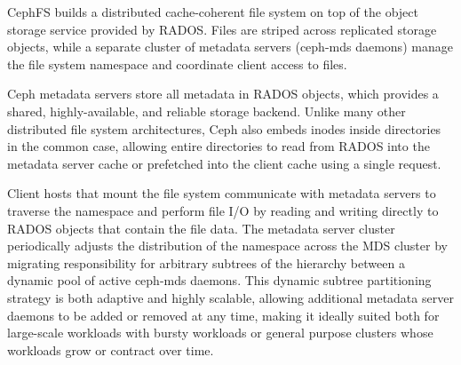 CephFS builds a distributed cache-coherent file system on top of the object
storage service provided by RADOS.  Files are striped across replicated
storage objects, while a separate cluster of metadata servers (ceph-mds
daemons) manage the file system namespace and coordinate client access to
files.  

Ceph metadata servers store all metadata in RADOS objects, which provides a
shared, highly-available, and reliable storage backend.  Unlike many other
distributed file system architectures, Ceph also embeds inodes inside
directories in the common case, allowing entire directories to read from RADOS
into the metadata server cache or prefetched into the client cache using a
single request.

Client hosts that mount the file system communicate with metadata
servers to traverse the namespace and perform file I/O by reading and writing
directly to RADOS objects that contain the file data.  The metadata server
cluster periodically adjusts
the distribution of the namespace across the MDS cluster by migrating
responsibility for arbitrary subtrees of the hierarchy between a dynamic pool
of active ceph-mds daemons.  This dynamic subtree
partitioning~\cite{Weil:2004:dynamic} strategy is both adaptive and highly
scalable, allowing additional metadata server daemons to be added or removed
at any time, making it ideally suited both for large-scale workloads with
bursty workloads or general purpose clusters whose workloads grow or contract
over time.

